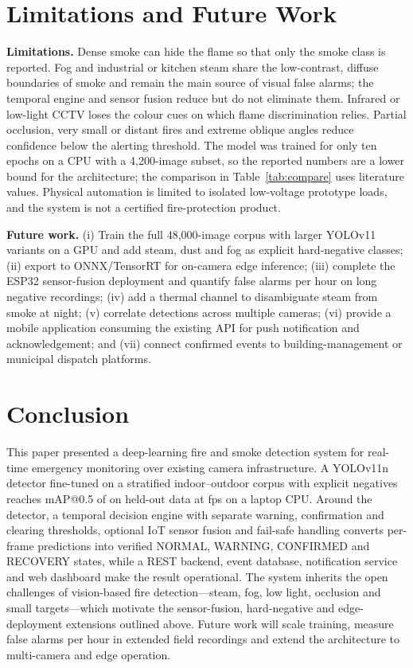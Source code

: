 \documentclass[conference]{IEEEtran}
\begin{document}
\section{Limitations and Future Work}\label{sec:limits}
\textbf{Limitations.} Dense smoke can hide the flame so that only the smoke class is reported. Fog and industrial or kitchen steam share the low-contrast, diffuse boundaries of smoke and remain the main source of visual false alarms; the temporal engine and sensor fusion reduce but do not eliminate them. Infrared or low-light CCTV loses the colour cues on which flame discrimination relies. Partial occlusion, very small or distant fires and extreme oblique angles reduce confidence below the alerting threshold. The model was trained for only ten epochs on a CPU with a 4{,}200-image subset, so the reported numbers are a lower bound for the architecture; the comparison in Table~\ref{tab:compare} uses literature values. Physical automation is limited to isolated low-voltage prototype loads, and the system is not a certified fire-protection product.

\textbf{Future work.} (i) Train the full 48{,}000-image corpus with larger YOLOv11 variants on a GPU and add steam, dust and fog as explicit hard-negative classes; (ii) export to ONNX/TensorRT for on-camera edge inference; (iii) complete the ESP32 sensor-fusion deployment and quantify false alarms per hour on long negative recordings; (iv) add a thermal channel to disambiguate steam from smoke at night; (v) correlate detections across multiple cameras; (vi) provide a mobile application consuming the existing API for push notification and acknowledgement; and (vii) connect confirmed events to building-management or municipal dispatch platforms.

\section{Conclusion}\label{sec:conc}
This paper presented a deep-learning fire and smoke detection system for real-time emergency monitoring over existing camera infrastructure. A YOLOv11n detector fine-tuned on a stratified indoor--outdoor corpus with explicit negatives reaches mAP@0.5 of \MAPtot{} on held-out data at \LATfps{} fps on a laptop CPU. Around the detector, a temporal decision engine with separate warning, confirmation and clearing thresholds, optional IoT sensor fusion and fail-safe handling converts per-frame predictions into verified NORMAL, WARNING, CONFIRMED and RECOVERY states, while a REST backend, event database, notification service and web dashboard make the result operational. The system inherits the open challenges of vision-based fire detection---steam, fog, low light, occlusion and small targets---which motivate the sensor-fusion, hard-negative and edge-deployment extensions outlined above. Future work will scale training, measure false alarms per hour in extended field recordings and extend the architecture to multi-camera and edge operation.
\end{document}
